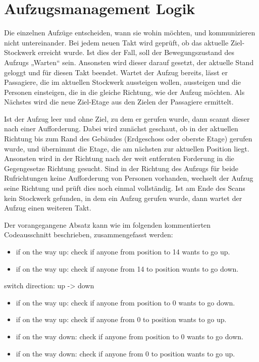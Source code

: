\documentclass[envcountsame, envcountchap, deutsch]{i-studis}
\providecommand{\tightlist}{%
  \setlength{\itemsep}{0pt}\setlength{\parskip}{0pt}}
\begin{document}
\hypertarget{aufzugsmanagement-logik}{%
\chapter{Aufzugsmanagement Logik}\label{aufzugsmanagement-logik}}

Die einzelnen Aufzüge entscheiden, wann sie wohin möchten, und
kommunizieren nicht untereinander. Bei jedem neuen Takt wird geprüft, ob
das aktuelle Ziel-Stockwerk erreicht wurde. Ist dies der Fall, soll der
Bewegungszustand des Aufzugs „Warten`` sein. Ansonsten wird dieser
darauf gesetzt, der aktuelle Stand geloggt und für diesen Takt beendet.
Wartet der Aufzug bereits, lässt er Passagiere, die im aktuellen
Stockwerk aussteigen wollen, aussteigen und die Personen einsteigen, die
in die gleiche Richtung, wie der Aufzug möchten. Als Nächstes wird die
neue Ziel-Etage aus den Zielen der Passagiere ermittelt.

Ist der Aufzug leer und ohne Ziel, zu dem er gerufen wurde, dann scannt
dieser nach einer Aufforderung. Dabei wird zunächst geschaut, ob in der
aktuellen Richtung bis zum Rand des Gebäudes (Erdgeschoss oder oberste
Etage) gerufen wurde, und übernimmt die Etage, die am nächsten zur
aktuellen Position liegt. Ansonsten wird in der Richtung nach der weit
entfernten Forderung in die Gegengesetze Richtung gesucht. Sind in der
Richtung des Aufzugs für beide Rufrichtungen keine Aufforderung von
Personen vorhanden, wechselt der Aufzug seine Richtung und prüft dies
noch einmal vollständig. Ist am Ende des Scans kein Stockwerk gefunden,
in dem ein Aufzug gerufen wurde, dann wartet der Aufzug einen weiteren
Takt.

Der vorangegangene Absatz kann wie im folgenden kommentierten
Codeausschnitt beschrieben, zusammengefasst werden:

\begin{itemize}
\tightlist
\item
  if on the way up: check if anyone from position to 14 wants to go up.
\item
  if on the way up: check if anyone from 14 to position wants to go
  down.
\end{itemize}

switch direction: up -\textgreater{} down

\begin{itemize}
\item
  if on the way up: check if anyone from position to 0 wants to go down.
\item
  if on the way up: check if anyone from 0 to position wants to go up.
\item
  if on the way down: check if anyone from position to 0 wants to go
  down.
\item
  if on the way down: check if anyone from 0 to position wants to go up.
\end{itemize}
\end{document}
